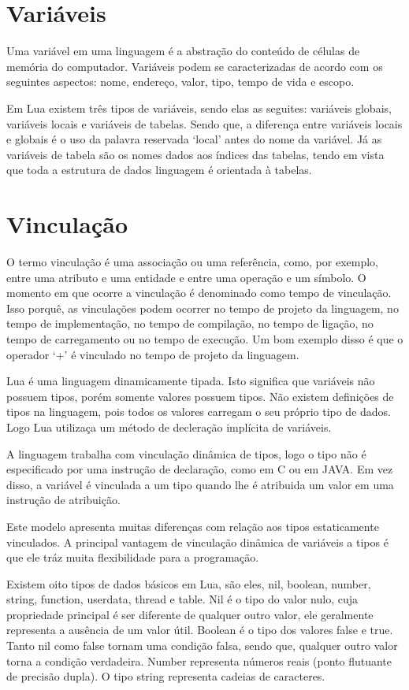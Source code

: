 \documentclass[
	12pt,				%
	openright,			%
	twoside,			%
	a4paper,			%
	english,			%
	brazil,				%
	]{abntex2}
\begin{document}
\section{Variáveis}
Uma variável em uma linguagem é a abstração do conteúdo de células de memória do computador. Variáveis podem se caracterizadas de acordo com os seguintes aspectos: nome, endereço, valor, tipo, tempo de vida e escopo.

Em Lua existem três tipos de variáveis, sendo elas as seguites: variáveis globais, variáveis locais e variáveis de tabelas. Sendo que, a diferença entre variáveis locais e globais é o uso da palavra reservada `local' antes do nome da variável. Já as variáveis de tabela são os nomes dados aos índices das tabelas, tendo em vista que toda a estrutura de dados linguagem é orientada à tabelas.

\section{Vinculação}
O termo vinculação é uma associação ou uma referência, como, por exemplo, entre uma atributo e uma entidade e entre uma operação e um símbolo. O momento em que ocorre a vinculação é denominado como tempo de vinculação. Isso porquê, as vinculações podem ocorrer no tempo de projeto da linguagem, no tempo de implementação, no tempo de compilação, no tempo de ligação, no tempo de carregamento ou no tempo de execução. Um bom exemplo disso é que o operador `+' é vinculado no tempo de projeto da linguagem.

Lua é uma linguagem dinamicamente tipada. Isto significa que variáveis não possuem tipos, porém somente valores possuem tipos. Não existem definições de tipos na linguagem, pois todos os valores carregam o seu próprio tipo de dados. Logo Lua utilizaça um método de decleração implícita de variáveis.

A linguagem trabalha com vinculação dinâmica de tipos, logo o tipo não é especificado por uma instrução de declaração, como em C ou em JAVA. Em vez disso, a variável é vinculada a um tipo quando lhe é atribuida um valor em uma instrução de atribuição.

Este modelo apresenta muitas diferenças com relação aos tipos estaticamente vinculados. A principal vantagem de vinculação dinâmica de variáveis a tipos é que ele tráz muita flexibilidade para a programação.

Existem oito tipos de dados básicos em Lua, são eles, nil, boolean, number, string, function, userdata, thread e table. Nil é o tipo do valor nulo, cuja propriedade principal é ser diferente de qualquer outro valor, ele geralmente representa a ausência de um valor útil. Boolean é o tipo dos valores false e true. Tanto nil como false tornam uma condição falsa, sendo que, qualquer outro valor torna a condição verdadeira. Number representa números reais (ponto flutuante de precisão dupla). O tipo string representa cadeias de caracteres.
\end{document}

